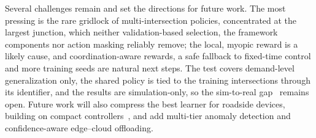 Several challenges remain and set the directions for future work. The most pressing is the rare gridlock of multi-intersection policies, concentrated at the largest junction, which neither validation-based selection, the framework components nor action masking reliably remove; the local, myopic reward is a likely cause, and coordination-aware rewards, a safe fallback to fixed-time control and more training seeds are natural next steps. The test covers demand-level generalization only, the shared policy is tied to the training intersections through its identifier, and the results are simulation-only, so the sim-to-real gap~\cite{rafi2026sim2signal} remains open. Future work will also compress the best learner for roadside devices, building on compact controllers~\cite{xing2022tinylight,gu2024pilight}, and add multi-tier anomaly detection and confidence-aware edge--cloud offloading.
